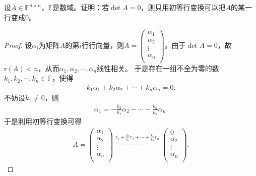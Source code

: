 \documentclass[../../main.tex]{subfiles}%
\begin{document}
\begin{example}
设\(A \in \mathbb{F}^{n\times n}\)，\(\mathbb{F}\)是数域。证明：若\(\det A = 0\)，则只用初等行变换可以把\(A\)的某一行变成\(0\)。
\end{example}
\begin{proof}
设\(\alpha_i\)为矩阵\(A\)的第\(i\)行行向量，则\(A=\left( \begin{array}{c} \alpha_1\\ \alpha_2\\ \vdots\\ \alpha_n\\ \end{array} \right)\)。由于\(\det A=0\)，故\(\text{r}(A) < n\)，从而\(\alpha_1,\alpha_2,\cdots,\alpha_n\)线性相关。
于是存在一组不全为零的数\(k_1,k_2,\cdots,k_n\in \mathbb{F}\)，使得
\begin{align*}
k_1\alpha_1 + k_2\alpha_2 + \cdots + k_n\alpha_n = 0.
\end{align*}
不妨设\(k_1\ne 0\)，则
\begin{align*}
\alpha_1 = -\frac{k_2}{k_1}\alpha_2 - \cdots - \frac{k_n}{k_1}\alpha_n.
\end{align*}
于是利用初等行变换可得
\begin{align*}
A = \left( \begin{array}{c} \alpha_1\\ \alpha_2\\ \vdots\\ \alpha_n\\ \end{array} \right) \xrightarrow{r_1 + \frac{k_2}{k_1}r_2 + \cdots + \frac{k_n}{k_1}r_n} \left( \begin{array}{c} 0\\ \alpha_2\\ \vdots\\ \alpha_n\\ \end{array} \right).
\end{align*}
\end{proof}
\end{document}
